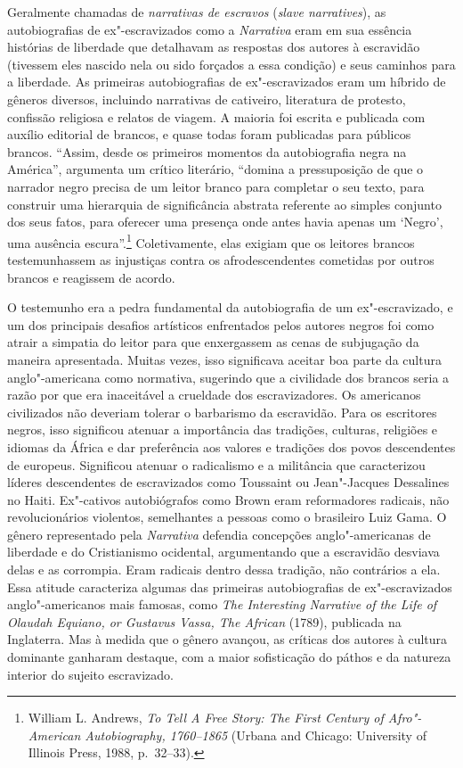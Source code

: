 Geralmente chamadas de \emph{narrativas de escravos} (\emph{slave narratives}), as autobiografias
de ex"-escravizados como a \emph{Narrativa} eram em sua essência histórias de
liberdade que detalhavam as respostas dos autores à escravidão (tivessem
eles nascido nela ou sido forçados a essa condição) e seus caminhos para
a liberdade. As primeiras autobiografias de ex"-escravizados eram um híbrido
de gêneros diversos, incluindo narrativas de cativeiro, literatura de
protesto, confissão religiosa e relatos de viagem. A maioria foi escrita
e publicada com auxílio editorial de brancos, e quase todas foram
publicadas para públicos brancos. ``Assim, desde os primeiros momentos
da autobiografia negra na América'', argumenta um crítico literário,
``domina a pressuposição de que o narrador negro precisa de um leitor
branco para completar o seu texto, para construir uma hierarquia de
significância abstrata referente ao simples conjunto dos seus fatos,
para oferecer uma presença onde antes havia apenas um `Negro', uma
ausência escura''.\footnote{William L. Andrews, \emph{To Tell A Free
  Story: The First Century of Afro"-American Autobiography, 1760--1865}
  (Urbana and Chicago: University of Illinois Press, 1988, p.~32--33).}
Coletivamente, elas exigiam que os leitores brancos testemunhassem as
injustiças contra os afrodescendentes cometidas por outros brancos e
reagissem de acordo.

O testemunho era a pedra fundamental da autobiografia de um ex"-escravizado,
e um dos principais desafios artísticos enfrentados pelos autores negros
foi como atrair a simpatia do leitor para que enxergassem as cenas de
subjugação da maneira apresentada. Muitas vezes, isso significava
aceitar boa parte da cultura anglo"-americana como normativa, sugerindo
que a civilidade dos brancos seria a razão por que era inaceitável a
crueldade dos escravizadores. Os americanos civilizados não deveriam
tolerar o barbarismo da escravidão. Para os escritores negros, isso
significou atenuar a importância das tradições, culturas, religiões e
idiomas da África e dar preferência aos valores e tradições dos povos
descendentes de europeus. Significou atenuar o radicalismo e a
militância que caracterizou líderes descendentes de escravizados como
Toussaint ou Jean"-Jacques Dessalines no Haiti. Ex"-cativos autobiógrafos
como Brown eram reformadores radicais, não revolucionários violentos,
semelhantes a pessoas como o brasileiro Luiz Gama. O gênero representado
pela \emph{Narrativa} defendia concepções anglo"-americanas de liberdade
e do Cristianismo ocidental, argumentando que a escravidão desviava
delas e as corrompia. Eram radicais dentro dessa tradição, não
contrários a ela. Essa atitude caracteriza algumas das primeiras
autobiografias de ex"-escravizados anglo"-americanos mais famosas, como
\emph{The Interesting Narrative of the Life of Olaudah Equiano, or
Gustavus Vassa, The African} (1789), publicada na
Inglaterra. Mas à medida que o gênero avançou, as críticas dos autores à
cultura dominante ganharam destaque, com a maior sofisticação do páthos
e da natureza interior do sujeito escravizado.

